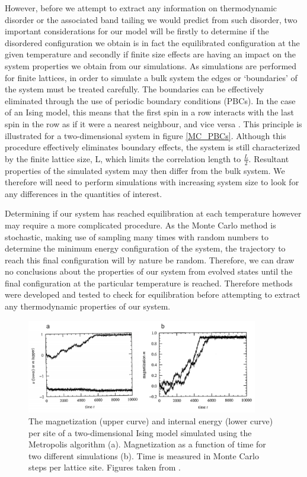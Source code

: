 \documentclass[11pt, twoside]{report}
\begin{document}
However, before we attempt to extract any information on thermodynamic disorder or the associated band tailing we would predict from such disorder, two important considerations for our model will be firstly to determine if the disordered configuration we obtain is in fact the equilibrated configuration at the given temperature and secondly if finite size effects are having an impact on the system properties we obtain from our simulations.
As simulations are performed for finite lattices, in order to simulate a bulk system the edges or `boundaries' of the system must be treated carefully. The boundaries can be effectively eliminated through the use of periodic boundary conditions (PBCs). In the case of an Ising model, this means that the first spin in a row interacts with the last spin in the row as if it were a nearest neighbour, and vice versa \cite{MC_Landau}. This principle is illustrated for a two-dimensional system in figure \ref{MC_PBCs}. Although this procedure effectively eliminates boundary effects, the system is still characterized by the finite lattice size, L, which limits the correlation length to $\frac{L}{2}$. Resultant properties of the simulated system may then differ from the bulk system. We therefore will need to perform simulations with increasing system size to look for any differences in the quantities of interest.

Determining if our system has reached equilibration at each temperature however may require a more complicated procedure. As the Monte Carlo method is stochastic, making use of sampling many times with random numbers to determine the minimum energy configuration of the system, the trajectory to reach this final configuration will by nature be random. Therefore, we can draw no conclusions about the properties of our system from evolved states until the final configuration at the particular temperature is reached. Therefore methods were developed and tested to check for equilibration before attempting to extract any thermodynamic properties of our system.

\begin{figure}[h!]
  \centering
    \includegraphics[width=0.9\textwidth]{figures/ising_equil.png}
    \caption{The magnetization (upper curve) and internal energy (lower curve) per site of a two-dimensional Ising model simulated using the Metropolis algorithm (a). Magnetization as a function of time for two different simulations (b). Time is measured in Monte Carlo steps per lattice site. Figures taken from .}
  \label{ising_equil}
\end{figure}
\end{document}
